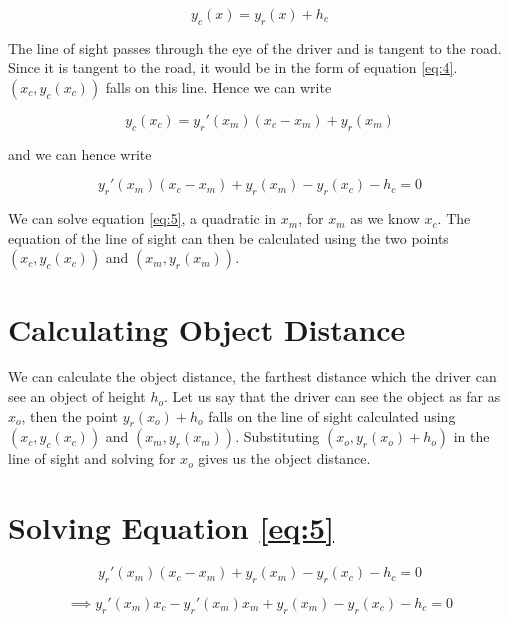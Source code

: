 \documentclass{article}
\begin{document}
    \begin{equation*}
        y_{c}(x) = y_{r}(x) + h_{c}
    \end{equation*}
    
    The line of sight passes through the eye of the driver and is tangent to the road. Since it is tangent to the road, it would be in the form of equation \ref{eq:4}. $(x_{c}, y_{c}(x_{c}))$ falls on this line. Hence we can write
    
    \begin{equation*}
        y_{c}(x_{c}) = y_{r}'(x_{m})(x_{c} - x_{m}) + y_{r}(x_{m})
    \end{equation*}
    
    and we can hence write
    
    \begin{equation} \label{eq:5}
        y_{r}'(x_{m})(x_{c} - x_{m}) + y_{r}(x_{m}) - y_{r}(x_{c}) - h_{c} = 0
    \end{equation}
    
    We can solve equation \ref{eq:5}, a quadratic in $x_{m}$, for $x_{m}$ as we know $x_{c}$. The equation of the line of sight can then be calculated using the two points $(x_{c}, y_{c}(x_{c}))$ and $(x_{m}, y_{r}(x_{m}))$.
    
\section{Calculating Object Distance}
    We can calculate the object distance, the farthest distance which the driver can see an object of height $h_{o}$. Let  us say that the driver can see the object as far as $x_{o}$, then the point $y_{r}(x_{o}) + h_{o}$ falls on the line of sight calculated using $(x_{c}, y_{c}(x_{c}))$ and $(x_{m}, y_{r}(x_{m}))$. Substituting $(x_{o}, y_{r}(x_{o}) + h_{o})$ in the line of sight and solving for $x_{o}$ gives us the object distance.
    
\section{Solving Equation \ref{eq:5}}
    \begin{equation*}
        y_{r}'(x_{m})(x_{c} - x_{m}) + y_{r}(x_{m}) - y_{r}(x_{c}) - h_{c} = 0
    \end{equation*}
    
    \begin{equation*}
        \implies y_{r}'(x_{m})x_{c} - y_{r}'(x_{m})x_{m} + y_{r}(x_{m}) - y_{r}(x_{c}) - h_{c} = 0
    \end{equation*}
    
\end{document}
